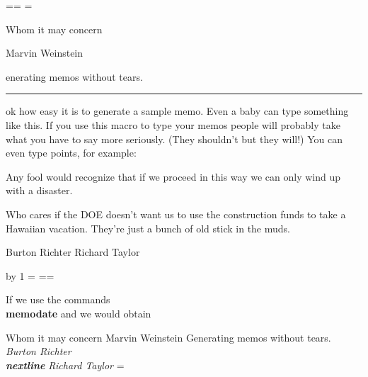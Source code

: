 \endpage
\lastpage=\pagenumber \lastchap=\chapternumber
\lastsection=\sectionnumber \let\lastchapterlabel=\chapterlabel
 
\MEMO
\to
Whom it may concern
 
\from
Marvin Weinstein
 
\subject
Generating memos without tears.
 
\rule
 
Look how easy it is to generate a sample memo.
Even a baby can type something like this.
If you use this macro to type your memos people will probably
take what you have to say more seriously.
(They shouldn't but they will!)
You can even type points, for example:
 
\pointbegin
Any fool would recognize that if we proceed in this way we can only
wind up with a disaster.
 
\point
Who cares if the DOE doesn't want us to use the construction funds
to take a Hawaiian vacation.  They're just a bunch of old stick in the
muds.
 
\copies
Burton Richter  \nextline
Richard Taylor
 
\endpage
 
\papers \advance\lastpage by 1 \pagenumber=\lastpage
\chapternumber=\lastchap \sectionnumber=\lastsection
\let\chapterlabel=\lastchapterlabel
 
If we use the commands {\bf \\memodate} and
we would obtain
 
\vbox{
\tc{\\to}
Whom it may concern
\tc{\\from}
Marvin Weinstein
\tc{\\topic}
Generating memos without tears.
\tc{\\rule}
\tc{\\copies}
{\it Burton Richter \bf \\nextline} \nextline
{\it Richard Taylor }
\tc{\endpage}}
\lastpage=\pagenumber
\endpage
 
